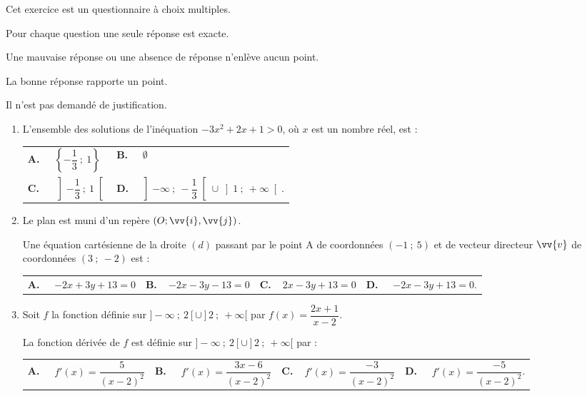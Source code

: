 \medskip
Cet exercice est un questionnaire à choix multiples. 

Pour chaque question une seule réponse est exacte. 

Une mauvaise réponse ou une absence de réponse n'enlève aucun point. 

La bonne réponse rapporte un point.

Il n'est pas demandé de justification.

\medskip

\begin{enumerate}
\item L'ensemble des solutions de l'inéquation $-3x^2+2x+1>0$, où $x$ est un nombre réel, est :

\begin{tabularx}{\linewidth}{*{2}{X}}
\textbf{A.~~} $\left\{-\dfrac{1}{3}~;~1\right\} $ &\textbf{B.~~} $\emptyset$\\\textbf{C.~~ }$\left]-\dfrac{1}{3}~;~1\right[  $& \textbf{D.~~}$\left]-\infty~;~-\dfrac{1}{3}\right[\cup\left]1~;~+\infty\right[ $.
\end{tabularx}
\medskip

\item Le plan est muni d'un repère $(O;\vv{i},\vv{j})$.

Une équation cartésienne de la droite $(d)$ passant par le point A de coordonnées $(-1~;~5)$ et de vecteur directeur $\vv{v}$ de coordonnées $(3~;~-2)$ est :

\medskip

\begin{tabularx}{\linewidth}{*{4}{X}}
\textbf{A.~~} $-2x+3y+13=0$&\textbf{B.~~}$-2x-3y-13=0 $&\textbf{C.~~}$2x - 3y + 13 = 0 $& \textbf{D.~~} \small $-2x - 3y + 13 = 0$.
\end{tabularx}

\medskip

\item Soit $f$ la fonction définie sur $]-\infty~;~2[ \cup  ]2~;~+\infty[$ par $f(x)=\dfrac{2x+1}{x - 2}$.

La fonction dérivée de $f$ est définie sur $]-\infty~;~2[ \cup  ]2~;~+\infty[$ par :

\medskip

\begin{tabularx}{\linewidth}{*{4}{X}}
\textbf{A.~~} $ f'(x)=\dfrac{5}{(x-2)^2}$ &\textbf{B.~~} $f'(x)= \dfrac{3x-6}{(x-2)^2} $&\textbf{C.~~}$f'(x)=\dfrac{-3}{(x-2)^2} $& \textbf{D.~~} $ f'(x) = \dfrac{-5}{(x-2)^2 }$.
\end{tabularx}


\end{enumerate}
